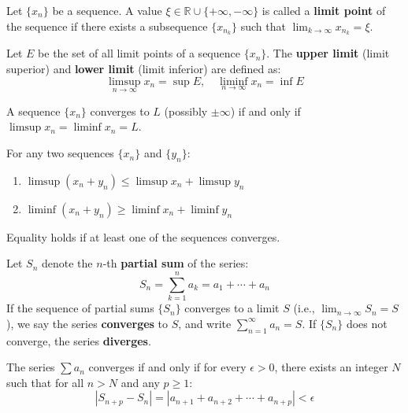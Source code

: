 \begin{definition}
Let $\{x_n\}$ be a sequence. A value $\xi \in \mathbb{R} \cup \{+\infty, -\infty\}$ is called a \textbf{limit point} of the sequence if there exists a subsequence $\{x_{n_k}\}$ such that $\lim_{k \to \infty} x_{n_k} = \xi$.
\end{definition}

\begin{definition}
Let $E$ be the set of all limit points of a sequence $\{x_n\}$. The \textbf{upper limit} (limit superior) and \textbf{lower limit} (limit inferior) are defined as:
\[ \limsup_{n \to \infty} x_n = \sup E, \quad \liminf_{n \to \infty} x_n = \inf E \]
\end{definition}

\begin{theorem}
A sequence $\{x_n\}$ converges to $L$ (possibly $\pm \infty$) if and only if $\limsup x_n = \liminf x_n = L$.
\end{theorem}

\begin{property}
For any two sequences $\{x_n\}$ and $\{y_n\}$:
\begin{enumerate}
    \item $\limsup (x_n + y_n) \le \limsup x_n + \limsup y_n$
    \item $\liminf (x_n + y_n) \ge \liminf x_n + \liminf y_n$
\end{enumerate}
Equality holds if at least one of the sequences converges.
\end{property}

\begin{definition}[Convergence]
Let $S_n$ denote the $n$-th \textbf{partial sum} of the series:
\[ S_n = \sum_{k=1}^{n} a_k = a_1 + \cdots + a_n \]
If the sequence of partial sums $\{S_n\}$ converges to a limit $S$ (i.e., $\lim_{n \to \infty} S_n = S$), we say the series \textbf{converges} to $S$, and write $\sum_{n=1}^{\infty} a_n = S$.
If $\{S_n\}$ does not converge, the series \textbf{diverges}.
\end{definition}

\begin{theorem}
The series $\sum a_n$ converges if and only if for every $\epsilon > 0$, there exists an integer $N$ such that for all $n > N$ and any $p \ge 1$:
\[ |S_{n+p} - S_n| = |a_{n+1} + a_{n+2} + \cdots + a_{n+p}| < \epsilon \]
\end{theorem}

